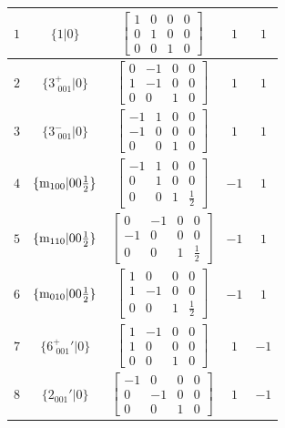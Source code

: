 \documentclass[fleqn,8pt]{jsarticle}
\begin{document}
\begin{longtable}{ccccc}
$ 1 $ & $ \{1|0\} $ & $ \begin{bmatrix} 1 & 0 & 0 & 0 \\ 0 & 1 & 0 & 0 \\ 0 & 0 & 1 & 0 \end{bmatrix} $ & $ 1 $ & $ 1 $ \\ \hline
$ 2 $ & $ \{3^{+}_{\,\,001}|0\} $ & $ \begin{bmatrix} 0 & -1 & 0 & 0 \\ 1 & -1 & 0 & 0 \\ 0 & 0 & 1 & 0 \end{bmatrix} $ & $ 1 $ & $ 1 $ \\ \hline
$ 3 $ & $ \{3^{-}_{\,\,001}|0\} $ & $ \begin{bmatrix} -1 & 1 & 0 & 0 \\ -1 & 0 & 0 & 0 \\ 0 & 0 & 1 & 0 \end{bmatrix} $ & $ 1 $ & $ 1 $ \\ \hline
$ 4 $ & $ \{{\rm m}_{100}|0 0 \frac{1}{2}\} $ & $ \begin{bmatrix} -1 & 1 & 0 & 0 \\ 0 & 1 & 0 & 0 \\ 0 & 0 & 1 & \frac{1}{2} \end{bmatrix} $ & $ -1 $ & $ 1 $ \\ \hline
$ 5 $ & $ \{{\rm m}_{110}|0 0 \frac{1}{2}\} $ & $ \begin{bmatrix} 0 & -1 & 0 & 0 \\ -1 & 0 & 0 & 0 \\ 0 & 0 & 1 & \frac{1}{2} \end{bmatrix} $ & $ -1 $ & $ 1 $ \\ \hline
$ 6 $ & $ \{{\rm m}_{010}|0 0 \frac{1}{2}\} $ & $ \begin{bmatrix} 1 & 0 & 0 & 0 \\ 1 & -1 & 0 & 0 \\ 0 & 0 & 1 & \frac{1}{2} \end{bmatrix} $ & $ -1 $ & $ 1 $ \\ \hline
$ 7 $ & $ \{6^{+}_{\,\,001}{}'|0\} $ & $ \begin{bmatrix} 1 & -1 & 0 & 0 \\ 1 & 0 & 0 & 0 \\ 0 & 0 & 1 & 0 \end{bmatrix} $ & $ 1 $ & $ -1 $ \\ \hline
$ 8 $ & $ \{2{}_{001}{}'|0\} $ & $ \begin{bmatrix} -1 & 0 & 0 & 0 \\ 0 & -1 & 0 & 0 \\ 0 & 0 & 1 & 0 \end{bmatrix} $ & $ 1 $ & $ -1 $ \\ \hline

\end{longtable}
\end{document}
